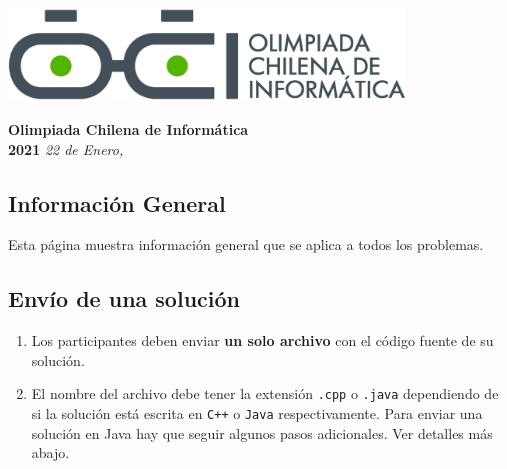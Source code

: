 \documentclass[12pt]{oci}
\begin{document}
  \begin{center}
  \includegraphics[height=70pt]{logo.eps}

  \vskip 70pt
  \Large{\bf Olimpiada Chilena de Inform\'atica\\ 2021}
  \vskip 10pt
  \large{\phase}
  \vskip 10pt
  \normalsize{\it 22 de Enero, \the\year}

  \vskip 85pt

  \vskip 10pt
\end{center} %

\cleardoublepage


\subsection*{Información General}

Esta página muestra información general que se aplica a todos los problemas.

\subsection*{Envío de una solución}

\begin{enumerate}
\item Los participantes deben enviar {\bf un solo archivo} con el código fuente de su solución.
\item El nombre del archivo debe tener la extensión \verb+.cpp+ o
  \verb+.java+ dependiendo de si la solución está escrita en
  \verb|C++| o \verb|Java| respectivamente.
Para enviar una solución en Java hay que seguir algunos pasos adicionales. Ver detalles más abajo.
\end{enumerate}
\end{document}
